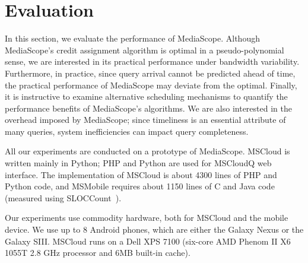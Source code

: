 \section{Evaluation}
\label{sec-4}


In this section, we evaluate the performance of MediaScope.
%
Although MediaScope's credit assignment algorithm is optimal in a
pseudo-polynomial sense, we are interested in its practical
performance under bandwidth variability.
%
Furthermore, in practice, since query arrival cannot be predicted
ahead of time, the practical performance of MediaScope may deviate
from the optimal.
%
Finally, it is instructive to examine alternative scheduling
mechanisms to quantify the performance benefits of MediaScope's
algorithms.
%
We are also interested in the overhead imposed by MediaScope; since
timeliness is an essential attribute of many queries, system
inefficiencies can impact query completeness.

All our experiments are conducted on a prototype of MediaScope.
%
MSCloud is written mainly in Python; PHP and Python are used for
MSCloudQ web interface.
%
The implementation of MSCloud is about 4300 lines of PHP and Python
code, and MSMobile requires about 1150 lines of C and Java code
(measured using SLOCCount~\cite{sloccount}).
%
%

Our experiments use commodity hardware, both for MSCloud and the
mobile device.
%
We use up to 8 Android phones, which are either the Galaxy Nexus or
the Galaxy SIII.
%
MSCloud runs on a Dell XPS 7100 (six-core AMD Phenom II X6 1055T 2.8
GHz processor and 6MB built-in cache).

